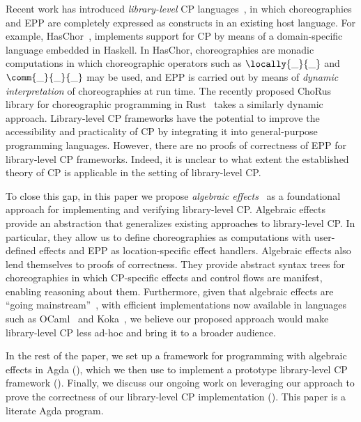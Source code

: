 Recent work has introduced \emph{library-level} CP languages~\citep{shen-2023, kashiwa-2023}, in which choreographies and EPP are completely expressed as constructs in an existing host language.  For example, HasChor~\citep{shen-2023}, implements support for CP by means of a domain-specific language embedded in Haskell.
In HasChor, choreographies are monadic computations in which choreographic operators such as $\locally{\_}{\_}$ and $\comm{\_}{\_}{\_}$ may be used, and EPP is carried out by means of \emph{dynamic interpretation} of choreographies at run time.  The recently proposed ChoRus library for choreographic programming in Rust~\citep{kashiwa-2023} takes a similarly dynamic approach.
%
Library-level CP frameworks have the potential to improve the accessibility and practicality of CP by integrating it into general-purpose programming languages.
%
However, there are no proofs of correctness of EPP for library-level CP frameworks. Indeed, it is unclear to what extent the established theory of CP is applicable in the setting of library-level CP.

To close this gap, in this paper we propose \emph{algebraic effects}~\citep{plotkin-2003, plotkin-2013} as a foundational approach for implementing and verifying library-level CP.
%
Algebraic effects provide an abstraction that generalizes existing approaches to library-level CP.
%
In particular, they allow us to define choreographies as computations with user-defined effects and EPP as location-specific effect handlers.
%
Algebraic effects also lend themselves to proofs of correctness.
%
They provide abstract syntax trees for choreographies in which CP-specific effects and control flows are manifest, enabling reasoning about them.
%
Furthermore, given that algebraic effects are ``going mainstream''~\citep{dagstuhl-alg-effects-report}, with efficient implementations now available in languages such as OCaml~\citep{sivaramakrishnan-ocaml-effect-handlers} and Koka~\citep{leijen-2017}, we believe our proposed approach would make library-level CP less ad-hoc and bring it to a broader audience.

In the rest of the paper, we set up a framework for programming with algebraic effects in Agda (), which we then use to implement a prototype library-level CP framework ().  Finally, we discuss our ongoing work on leveraging our approach to prove the correctness of our library-level CP implementation ().  This paper is a literate Agda program.



